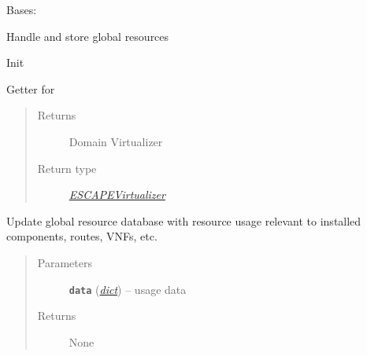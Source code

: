 \documentclass[letterpaper,10pt,english]{sphinxmanual}
\begin{document}
\begin{fulllineitems}
\label{adapt/adaptation:escape.adapt.adaptation.DomainResourceManager}
Bases: \href{https://docs.python.org/2.7/library/functions.html\#object}{}

Handle and store global resources

\begin{fulllineitems}
\label{adapt/adaptation:escape.adapt.adaptation.DomainResourceManager.__init__}
Init

\end{fulllineitems}


\begin{fulllineitems}
\label{adapt/adaptation:escape.adapt.adaptation.DomainResourceManager.dov}
Getter for {\hyperref[adapt/adaptation:escape.adapt.adaptation.DomainVirtualizer]{\emph{}}}
\begin{quote}\begin{description}
\item[{Returns}] \leavevmode
Domain Virtualizer

\item[{Return type}] \leavevmode
{\hyperref[orchest/virtualization_mgmt:escape.orchest.virtualization_mgmt.ESCAPEVirtualizer]{\emph{ESCAPEVirtualizer}}}

\end{description}\end{quote}

\end{fulllineitems}


\begin{fulllineitems}
\label{adapt/adaptation:escape.adapt.adaptation.DomainResourceManager.update_resource_usage}
Update global resource database with resource usage relevant to installed
components, routes, VNFs, etc.
\begin{quote}\begin{description}
\item[{Parameters}] \leavevmode
\textbf{\texttt{data}} (\href{https://docs.python.org/2.7/library/stdtypes.html\#dict}{\emph{dict}}) -- usage data

\item[{Returns}] \leavevmode
None

\end{description}\end{quote}

\end{fulllineitems}


\end{fulllineitems}
\end{document}
